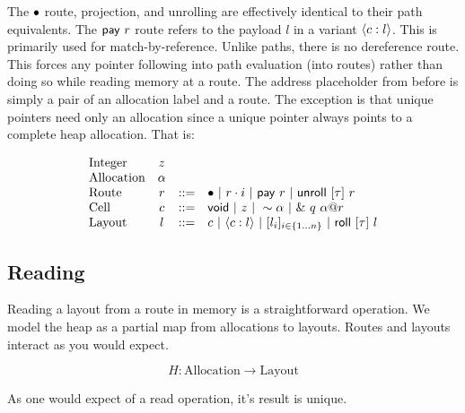 The $\bullet$ route, projection, and unrolling are effectively identical to their path equivalents.
The $\mathsf{pay}~{r}$ route refers to the payload $l$ in a variant $\langle{{c}:{l}}\rangle$.
This is primarily used for match-by-reference.
Unlike paths, there is no dereference route.
This forces any pointer following into path evaluation (into routes)
rather than doing so while reading memory at a route.
The address placeholder from before is simply a pair of an allocation label and a route.
The exception is that unique pointers need only an allocation since a unique pointer
always points to a complete heap allocation.
That is:

\[
\begin{array}{lccl}
\textrm{Integer} & z & & \\
\textrm{Allocation} & \alpha & & \\
\textrm{Route} & r & ::= & \bullet ~|~ {r}\cdot{i} ~|~ \mathsf{pay}~{r} ~|~ \mathsf{unroll}~[{\tau}]~{r} \\
\textrm{Cell} & c & ::= & \mathsf{void} ~|~ z ~|~ 
			      \sim{\alpha} ~|~ \&~{{q}~{{\alpha}@{r}}} \\
\textrm{Layout} & l & ::= & c ~|~ \langle{{c}:{l}}\rangle ~|~ 
			       [{{l}_{i}}]_{{i} \in \{1 \ldots {n}\} } ~|~ \mathsf{roll}~[{\tau}]~{l} \\
\end{array}
\]

\subsection*{Reading}

Reading a layout from a route in memory is a straightforward operation.
We model the heap as a partial map from allocations to layouts.
Routes and layouts interact as you would expect.

$$ H : \mathrm{Allocation} \to \mathrm{Layout} $$



As one would expect of a read operation, it's result is unique.

